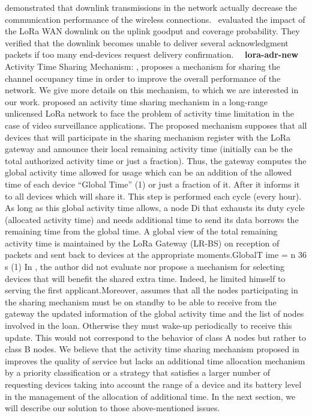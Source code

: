 demonstrated that downlink transmissions in the network actually decrease the communication performance of the wireless connections.~\citet{pop_does_2017} evaluated the impact of the LoRa WAN downlink on the uplink goodput and coverage probability. They verified that the downlink becomes unable to deliver several acknowledgment packets if too many end-devices request delivery confirmation.~~   \newline 
\textbf{lora-adr-new} \newline  \cite{pham_qos_2016}   Activity Time Sharing Mechanism: \cite{pham_qos_2016}, proposes a mechanism for sharing the channel occupancy time in order to improve the overall performance of the network. We give more details on this mechanism, to which we are interested in our work.\cite{pham_qos_2016} proposed an activity time sharing mechanism in a long-range unlicensed LoRa network to face the problem of activity time limitation in the case of video surveillance applications. The proposed mechanism supposes that all devices that will participate in the sharing mechanism register with the LoRa gateway and announce their local remaining activity time (initially can be the total authorized activity time or just a fraction). Thus, the gateway computes the global activity time allowed for usage which can be an addition of the allowed time of each device ``Global Time'' (1) or just a fraction of it. After it informs it to all devices which will share it. This step is performed each cycle (every hour). As long as this global activity time allows, a node Di that exhausts its duty cycle (allocated activity time) and needs additional time to send its data borrows the remaining time from the global time. A global view of the total remaining activity time is maintained by the LoRa Gateway (LR-BS) on reception of packets and sent back to devices at the appropriate moments.GlobalT ime = n \texttimes{} 36 s (1) In \cite{pham_qos_2016}, the author did not evaluate nor propose a mechanism for selecting devices that will benefit the shared extra time. Indeed, he limited himself to serving the first applicant.Moreover, \cite{pham_qos_2016} assumes that all the nodes participating in the sharing mechanism must be on standby to be able to receive from the gateway the updated information of the global activity time and the list of nodes involved in the loan. Otherwise they must wake-up periodically to receive this update. This would not correspond to the behavior of class A nodes but rather to class B nodes. We believe that the activity time sharing mechanism proposed in \cite{pham_qos_2016} improves the quality of service but lacks an additional time allocation mechanism by a priority classification or a strategy that satisfies a larger number of requesting devices taking into account the range of a device and its battery level in the management of the allocation of additional time. In the next section, we will describe our solution to those above-mentioned issues.   \newline 
